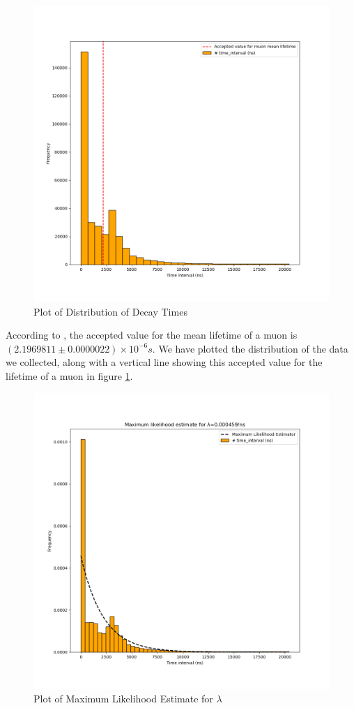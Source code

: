 \begin{figure}[H]
    \centering
    \includegraphics[scale=0.4]{img/data} 
    \caption{Plot of Distribution of Decay Times}
    \label{data}
\end{figure} 
According to \cite{ber}\cite{pat}, the accepted value for the mean lifetime of a muon is $(2.1969811\pm 0.0000022)\times 10^{-6}s$. We have plotted the distribution of the data we collected, along with a vertical line showing this accepted value for the lifetime of a muon in figure \ref{data}.
\begin{figure}[H]
    \centering
    \includegraphics[scale=0.4]{img/mle_estimate} 
    \caption{Plot of Maximum Likelihood Estimate for $\lambda$}
    \label{mle_estimate}
\end{figure} 
